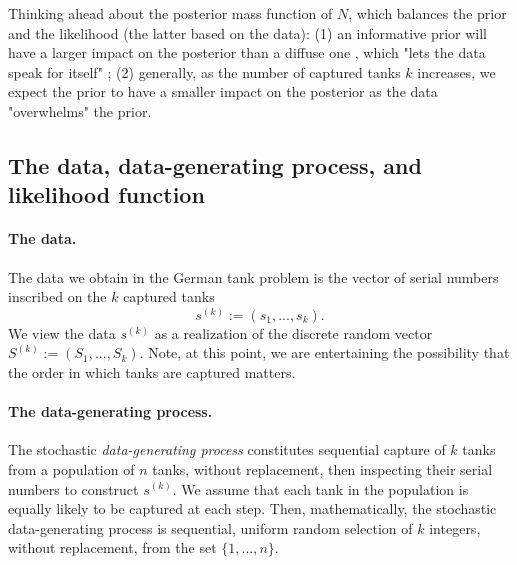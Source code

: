\documentclass[11pt, oneside]{article}
\begin{document}
Thinking ahead about the posterior mass function of $N$, which balances the prior and the likelihood (the latter based on the data): 
(1) an informative prior will have a larger impact on the posterior than a diffuse one \cite{van2021bayesian}, which "lets the data speak for itself" \cite{downey2021think};
(2) generally, as the number of captured tanks $k$ increases, we expect the prior to have a smaller impact on the posterior \cite{downey2021think} as the data "overwhelms" the prior.


\subsection{The data, data-generating process, and likelihood function}
\paragraph{The data.} The data we obtain in the German tank problem is the vector of serial numbers inscribed on the $k$ captured tanks
\begin{equation}
	s^{(k)}:=(s_1,...,s_k).
\end{equation} 
We view the data $s^{(k)}$ as a realization of the discrete random vector $S^{(k)}:=(S_1, ..., S_k)$. Note, at this point, we are entertaining the possibility that the order in which tanks are captured matters.

\paragraph{The data-generating process.}
The stochastic \emph{data-generating process} constitutes sequential capture of $k$ tanks from a population of $n$ tanks, without replacement, then inspecting their serial numbers to construct $s^{(k)}$.
We assume that each tank in the population is equally likely to be captured at each step.
Then, mathematically, the stochastic data-generating process is sequential, uniform random selection of $k$ integers, without replacement, from the set $\{1, ..., n\}$.
\end{document}
